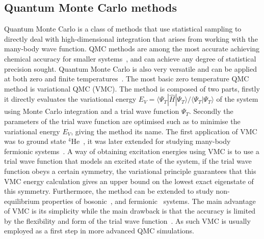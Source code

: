 \documentclass[final,3p,times,twocolumn]{elsarticle}
\begin{document}
	\subsection{Quantum Monte Carlo methods}
	\label{subsec:intro-QMC}
	Quantum Monte Carlo is a class of methods that use statistical sampling to directly deal with high-dimensional integration that arises from working with the many-body wave function. QMC methods are among the most accurate achieving chemical accuracy for smaller systems~\cite{foulkes2001quantum}, and can achieve any degree of statistical precision sought. Quantum Monte Carlo is also very versatile and can be applied at both zero and finite temperatures~\cite{austin2012quantum}.	
	The most basic zero temperature QMC method is variational QMC (VMC). The method is composed of two parts, firstly it directly evaluates the variational energy $E_V = \langle \Psi_{T} | \hat H | \Psi_{T} \rangle / \langle \Psi_{T} | \Psi_{T} \rangle$ of the system using Monte Carlo integration and a trial wave function $\Psi_{T}$. Secondly the parameters of the trial wave function are optimised such as to minimise the variational energy $E_V$, giving the method its name. The first application of VMC was to ground state ${}^4$He~\cite{mcmillan1965ground}, it was later extended for studying many-body fermionic systems~\cite{ceperley1977monte}. A way of obtaining excitation energies using VMC is to use a trial wave function that models an excited state of the system, if the trial wave function obeys a certain symmetry, the variational principle guarantees that this VMC energy calculation gives an upper bound on the lowest exact eigenstate of this symmetry. Furthermore, the method can be extended to study non-equilibrium properties of bosonic~\cite{carleo2012localization, carleo2014light}, and fermionic~\cite{ido2015time} systems. The main advantage of VMC is its simplicity while the main drawback is that the accuracy is limited by the flexibility and form of the trial wave function~\cite{austin2012quantum}. As such VMC is usually employed as a first step in more advanced QMC simulations. 
		
\end{document}
